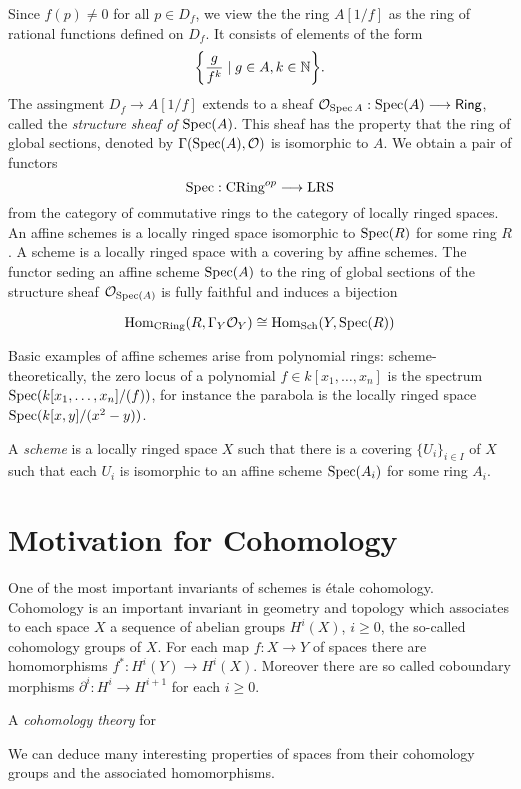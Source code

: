 Since $f(p) \neq 0$ for all $p \in D_f$, we view the the ring $A[1/f]$ as the ring of rational functions defined on $D_f$. It consists of elements of the form 
\[
  \biggl\{ \frac{g}{f^k} \mid g \in A, k \in \mathbb{N} \biggr\}.
\]
The assingment $D_f \to A[1/f]$ extends to a sheaf $\mathcal{O}_{\operatorname{Spec}{A}}: \operatorname{Spec}(A) \longrightarrow \mathsf{Ring}$, called the \textit{structure sheaf of $\operatorname{Spec}(A)$}. This sheaf has the property that the ring of global sections, denoted by $\Gamma(\operatorname{Spec}(A), \mathcal{O})$ is isomorphic to $A$. We obtain a pair of functors
\[
\operatorname{Spec} : \text{CRing}^{op} \longrightarrow \text{LRS}
\]
from the category of commutative rings to the category of locally ringed spaces. An affine schemes is a locally ringed space isomorphic to $\operatorname{Spec}(R)$ for some ring $R$. A scheme is a locally ringed space with a covering by affine schemes. The functor seding an affine scheme $\operatorname{Spec}(A)$ to the ring of global sections of the structure sheaf $\mathcal{O}_{\operatorname{Spec}(A)}$ is fully faithful and induces a bijection

\[
  \operatorname{Hom}_{\text{CRing}}(R, \Gamma_Y \mathcal{O}_Y) \cong \operatorname{Hom}_{\text{Sch}}(Y, \operatorname{Spec}(R))
\]

Basic examples of affine schemes arise from polynomial rings: scheme-theoretically, the zero locus of a polynomial $f \in k[x_1, \dots, x_n]$ is the spectrum $\operatorname{Spec}(k[x_1, \dots, x_n]/(f))$, for instance the parabola is the locally ringed space $\operatorname{Spec}(k[x,y]/(x^2-y))$.

\begin{definition}
  A \textit{scheme} is a locally ringed space $X$ such that there is a covering $\{U_i\}_{i \in I}$ of $X$ such that each $U_i$ is isomorphic to an affine scheme $\operatorname{Spec}(A_i)$ for some ring $A_i$.
\end{definition}

\section{Motivation for Cohomology}
One of the most important invariants of schemes is \'etale cohomology.  Cohomology is an important invariant in geometry and topology which associates to each space $X$ a sequence of abelian groups $H^i(X)$, $i \ge 0$, the so-called cohomology groups of $X$. For each map $f: X \to Y$ of spaces there are homomorphisms $f^*: H^i(Y) \to H^i(X)$. Moreover there are so called coboundary morphisms $\partial^i : H^i \to H^{i+1}$ for each $i \ge 0$.
\begin{definition}
    A \textit{cohomology theory} for
\end{definition}
We can deduce many interesting properties of spaces from their cohomology groups and the associated homomorphisms.

